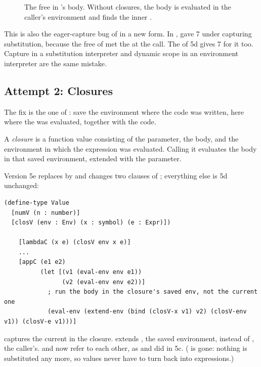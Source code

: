\begin{figure}[htbp]
\centering
{}
\caption{The free  in 's body. Without closures, the body is evaluated in the caller's environment and finds the inner .}
\label{fig:addx}
\end{figure}

This is also the eager-capture bug of  in a new form. In ,  gave 7 under capturing substitution, because the free  of  met the  at the call. The  of 5d gives 7 for it too. Capture in a substitution interpreter and dynamic scope in an environment interpreter are the same mistake.

\subsection{Attempt 2: Closures}

The fix is the one of : save the environment where the code was written, here where the  was evaluated, together with the code.

\begin{definition}[Closure]
A \emph{closure} is a function value consisting of the parameter, the body, and the environment in which the  expression was evaluated. Calling it evaluates the body in that saved environment, extended with the parameter.
\end{definition}
Version 5e replaces  by  and changes two clauses of ; everything else is 5d unchanged:
\begin{lstlisting}
(define-type Value
  [numV (n : number)]
  [closV (env : Env) (x : symbol) (e : Expr)])

    [lambdaC (x e) (closV env x e)]
    ...
    [appC (e1 e2)
          (let [(v1 (eval-env env e1))
                (v2 (eval-env env e2))]
            ; run the body in the closure's saved env, not the current one
            (eval-env (extend-env (bind (closV-x v1) v2) (closV-env v1)) (closV-e v1)))]
\end{lstlisting}
 captures the current  in the closure.  extends , the saved environment, instead of , the caller's.  and  now refer to each other, as  and  did in 5c. ( is gone: nothing is substituted any more, so values never have to turn back into expressions.)

